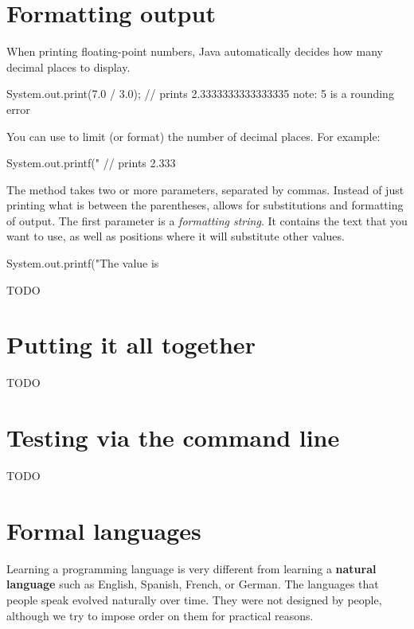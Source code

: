 \section{Formatting output}

When printing floating-point numbers, Java automatically decides how many decimal places to display.

\begin{code}
    System.out.print(7.0 / 3.0);
    // prints 2.3333333333333335   note: 5 is a rounding error
\end{code}

You can use  to limit (or format) the number of decimal places. For example:

\begin{code}
    System.out.printf("%
    // prints 2.333
\end{code}

The  method takes two or more parameters, separated by commas.
Instead of just printing what is between the parentheses,  allows for substitutions and formatting of output.
The first parameter is a {\em formatting string}.
It contains the text that you want to use, as well as positions where it will substitute other values.

\begin{code}
System.out.printf("The value is %
\end{code}

TODO


\section{Putting it all together}

TODO


\section{Testing via the command line}

TODO


\section{Formal languages}


Learning a programming language is very different from learning a {\bf natural language} such as English, Spanish, French, or German.
The languages that people speak evolved naturally over time.
They were not designed by people, although we try to impose order on them for practical reasons.

